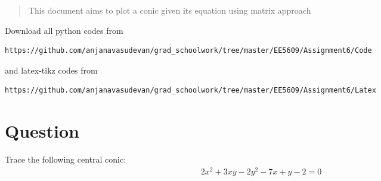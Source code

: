 \documentclass[journal,12pt,twocolumn]{IEEEtran}
\begin{document}
%
\maketitle
\begin{abstract}
This document aims to plot a conic given its equation using matrix approach
\end{abstract}
Download all python codes from
%
\begin{lstlisting}
https://github.com/anjanavasudevan/grad_schoolwork/tree/master/EE5609/Assignment6/Code
\end{lstlisting}
%
and latex-tikz codes from
%
\begin{lstlisting}
https://github.com/anjanavasudevan/grad_schoolwork/tree/master/EE5609/Assignment6/Latex
\end{lstlisting}
%
\section{Question}
Trace the following central conic:
\begin{align}
  2x^2 + 3xy - 2y^2 - 7x + y - 2 = 0 \label{eq:1}
\end{align}
\end{document}
